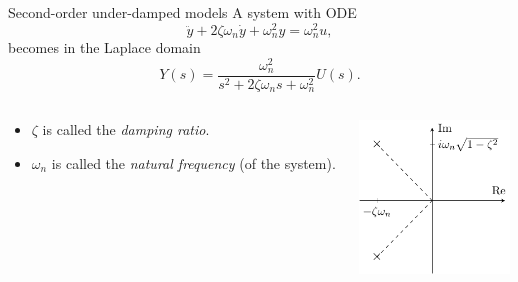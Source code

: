 \documentclass[presentation,aspectratio=169]{beamer}
\begin{document}
\begin{frame}[label={sec:orge2eae9b}]{Second-order under-damped models}
A system with ODE
$$ \ddot{y} + 2\zeta\omega_n\dot{y} + \omega_n^2 y = \omega_n^2 u, $$
becomes in the Laplace domain
$$ Y(s) = \frac{\omega_n^2}{s^2 + 2\zeta\omega_n s + \omega_n^2} U(s). $$
\begin{columns}
\begin{column}{0.4\columnwidth}
\begin{itemize}
\item \alert{\(\zeta\)} is called the \emph{damping ratio}.
\item \alert{\(\omega_n\)} is called the \emph{natural frequency} (of the system).
\end{itemize}
\end{column}

\begin{column}{0.6\columnwidth}
\begin{center}
    \includegraphics[width=4cm]{../../figures/implane-second-order-poles}
\end{center}
\end{column}
\end{columns}
\end{frame}
\end{document}

